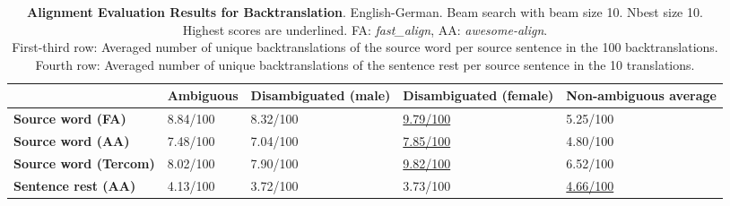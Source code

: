 \begin{table} 
    \label{tab:alignment_backtranslation}
    \begin{tabularx}{\linewidth}{|X|XXXX|}
        \hline
         & \textbf{Ambiguous} & \textbf{Disambiguated (male)} & \textbf{Disambiguated (female)} & \textbf{Non-ambiguous average} \\ \hline
         \textbf{Source word (FA)} & 8.84/100 & 8.32/100 & \underline{9.79/100} & 5.25/100 \\ 
         \textbf{Source word (AA)} & 7.48/100 & 7.04/100 & \underline{7.85/100} & 4.80/100 \\ 
         \textbf{Source word (Tercom)} & 8.02/100 & 7.90/100 & \underline{9.82/100} & 6.52/100 \\ \hline
         \textbf{Sentence rest (AA)} & 4.13/100 & 3.72/100 & 3.73/100 & \underline{4.66/100} \\ \hline
    \end{tabularx}
    \caption{\textbf{Alignment Evaluation Results for Backtranslation}. English-German. Beam search with beam size 10. Nbest size 10. Highest scores are underlined. FA: \textit{fast\_align}, AA: \textit{awesome-align}. \\ First-third row: Averaged number of unique backtranslations of the source word per source sentence in the 100 backtranslations. \\ Fourth row: Averaged number of unique backtranslations of the sentence rest per source sentence in the 10 translations.}
\end{table}

